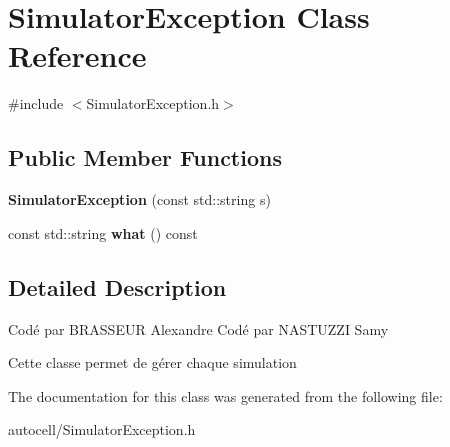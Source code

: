 \hypertarget{class_simulator_exception}{}\section{Simulator\+Exception Class Reference}
\label{class_simulator_exception}


{\ttfamily \#include $<$Simulator\+Exception.\+h$>$}

\subsection*{Public Member Functions}
\begin{DoxyCompactItemize}
\item 
\mbox{\label{class_simulator_exception_a664bb99021b50939cc28d2fc19ddf443}} 
{\bfseries Simulator\+Exception} (const std\+::string s)
\item 
\mbox{\label{class_simulator_exception_acfd2daa1c19b416ffa2de2ed1e3d61e6}} 
const std\+::string {\bfseries what} () const
\end{DoxyCompactItemize}


\subsection{Detailed Description}
Codé par B\+R\+A\+S\+S\+E\+UR Alexandre Codé par N\+A\+S\+T\+U\+Z\+ZI Samy

Cette classe permet de gérer chaque simulation 

The documentation for this class was generated from the following file\+:\begin{DoxyCompactItemize}
\item 
autocell/Simulator\+Exception.\+h\end{DoxyCompactItemize}
